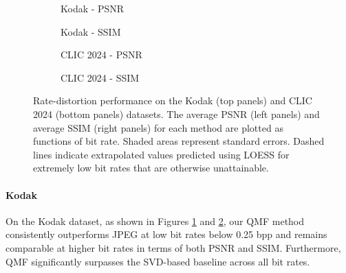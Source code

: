 \begin{figure*}[!t]
    \centering
    \begin{subfigure}[t]{0.5\textwidth}
        \centering
        \resizebox{.9\textwidth}{!}{}
        \caption{Kodak - PSNR}
        \label{fig:kodak_psnr}
    \end{subfigure}%
    \begin{subfigure}[t]{0.5\textwidth}
        \centering
        \resizebox{.9\textwidth}{!}{}
        \caption{Kodak - SSIM}
        \label{fig:kodak_ssim}
    \end{subfigure}

    \bigskip

    \begin{subfigure}[t]{.5\textwidth}
        \centering
        \resizebox{.9\textwidth}{!}{}
        \caption{CLIC 2024 - PSNR}
        \label{fig:clic_psnr}
    \end{subfigure}%
    \begin{subfigure}[t]{.5\textwidth}
        \centering
        \resizebox{.9\textwidth}{!}{}
        \caption{CLIC 2024 - SSIM}
        \label{fig:clic_ssim}
    \end{subfigure}
    \caption{Rate-distortion performance on the Kodak (top panels) and CLIC 2024 (bottom panels) datasets. The average PSNR (left panels) and average SSIM (right panels) for each method are plotted as functions of bit rate. Shaded areas represent standard errors. Dashed lines indicate extrapolated values predicted using LOESS \cite{cleveland1988locally} for extremely low bit rates that are otherwise unattainable.}
    \label{fig:rate_distortion}
\end{figure*}

\paragraph{Kodak}
On the Kodak dataset, as shown in Figures \ref{fig:kodak_psnr} and \ref{fig:kodak_ssim}, our QMF method consistently outperforms JPEG at low bit rates below 0.25 bpp and remains comparable at higher bit rates in terms of both PSNR and SSIM. Furthermore, QMF significantly surpasses the SVD-based baseline across all bit rates. 

